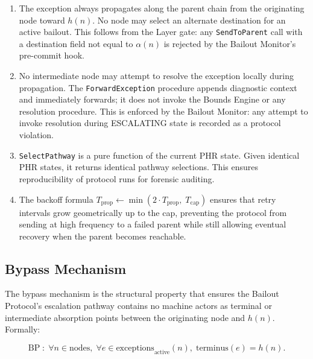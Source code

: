 \begin{enumerate}\itemsep=0pt
\item[\textbf{P1 (Path integrity).}] The exception always propagates along the parent chain from the originating node toward $h(n)$. No node may select an alternate destination for an active bailout. This follows from the \fact{} Layer gate: any \texttt{SendToParent} call with a destination field not equal to $\alpha(n)$ is rejected by the Bailout Monitor's pre-commit hook.

\item[\textbf{P2 (No local absorption).}] No intermediate node may attempt to resolve the exception locally during propagation. The \texttt{ForwardException} procedure appends diagnostic context and immediately forwards; it does not invoke the Bounds Engine or any resolution procedure. This is enforced by the Bailout Monitor: any attempt to invoke resolution during ESCALATING state is recorded as a protocol violation.

\item[\textbf{P3 (Deterministic pathway selection).}] \texttt{SelectPathway} is a pure function of the current PHR state. Given identical PHR states, it returns identical pathway selections. This ensures reproducibility of protocol runs for forensic auditing.

\item[\textbf{P4 (Exponential backoff with cap).}] The backoff formula $T_{\text{prop}} \leftarrow \min(2 \cdot T_{\text{prop}},\; T_{\text{cap}})$ ensures that retry intervals grow geometrically up to the cap, preventing the protocol from sending at high frequency to a failed parent while still allowing eventual recovery when the parent becomes reachable.
\end{enumerate}

\subsection{Bypass Mechanism}\label{sec:bypass}

The bypass mechanism is the structural property that ensures the Bailout Protocol's escalation pathway contains no machine actors as terminal or intermediate absorption points between the originating node and $h(n)$. Formally:

\begin{equation}
\text{BP} \;:\; \forall n \in \text{nodes},\; \forall e \in \text{exceptions}_{\text{active}}(n),\; \text{terminus}(e) = h(n). \tag{BP}
\end{equation}

